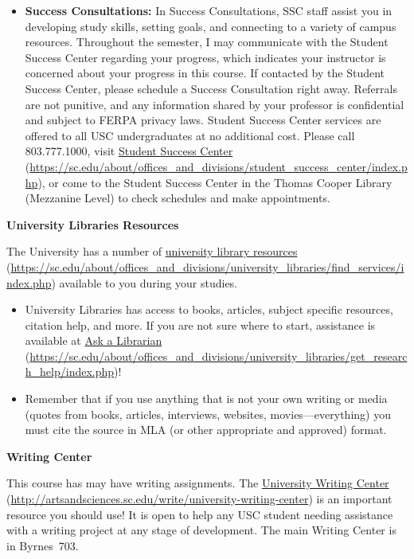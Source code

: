 \documentclass[11pt,letterpaper]{article}
\begin{document}
\begin{itemize}
	\item {\bfseries Success Consultations:} In Success Consultations, SSC staff assist you in developing study skills, setting goals, and connecting to a variety of campus resources. Throughout the semester, I may communicate with the Student Success Center regarding your progress, which indicates your instructor is concerned about your progress in this course. If contacted by the Student Success Center, please schedule a Success Consultation right away. Referrals are not punitive, and any information shared by your professor is confidential and subject to FERPA privacy laws. Student Success Center services are offered to all USC undergraduates at no additional cost. Please call 803.777.1000, visit \href{https://sc.edu/about/offices\_and\_divisions/student\_success\_center/index.php}{Student Success Center} (\url{https://sc.edu/about/offices\_and\_divisions/student\_success\_center/index.php}), or come to the Student Success Center in the Thomas Cooper Library (Mezzanine Level) to check schedules and make appointments.
	\end{itemize} \pvspace{0.1cm}



{\bfseries University Libraries Resources} \par
The University has a number of \href{https://sc.edu/about/offices\_and\_divisions/university\_libraries/find\_services/index.php}{university library resources} (\url{https://sc.edu/about/offices\_and\_divisions/university\_libraries/find\_services/index.php}) available to you during your studies.
	\begin{itemize}
	\item University Libraries has access to books, articles, subject specific resources, citation help, and more. If you are not sure where to start, assistance is available at \href{https://sc.edu/about/offices\_and\_divisions/university\_libraries/get\_research\_help/index.php}{Ask a Librarian} (\url{https://sc.edu/about/offices\_and\_divisions/university\_libraries/get\_research\_help/index.php})!
	\item Remember that if you use anything that is not your own writing or media (quotes from books, articles, interviews, websites, movies---everything) you must cite the source in MLA (or other appropriate and approved) format.
	\end{itemize} \pvspace{0.1cm}



{\bfseries Writing Center} \par
This course has may have writing assignments. The \href{http://artsandsciences.sc.edu/write/university-writing-center}{University Writing Center} (\url{http://artsandsciences.sc.edu/write/university-writing-center}) is an important resource you should use! It is open to help any USC student needing assistance with a writing project at any stage of development. The main Writing Center is in Byrnes~703. \sectionbreak
\end{document}
